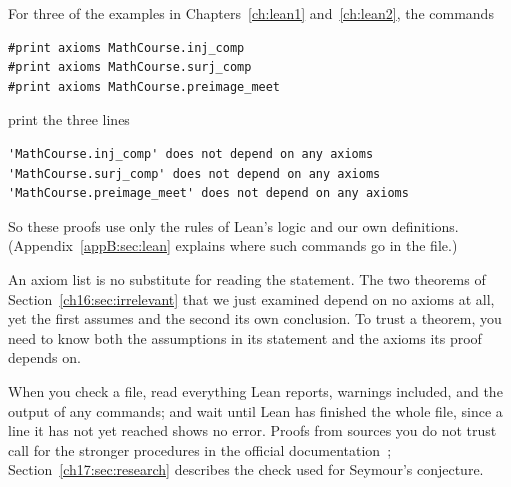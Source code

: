 For three of the examples in Chapters~\ref{ch:lean1} and~\ref{ch:lean2}, the commands
\par\noindent\begin{minipage}{\linewidth}
\begin{lstlisting}
#print axioms MathCourse.inj_comp
#print axioms MathCourse.surj_comp
#print axioms MathCourse.preimage_meet
\end{lstlisting}
\end{minipage}\par
print the three lines
\par\noindent\begin{minipage}{\linewidth}
\begin{lstlisting}
'MathCourse.inj_comp' does not depend on any axioms
'MathCourse.surj_comp' does not depend on any axioms
'MathCourse.preimage_meet' does not depend on any axioms
\end{lstlisting}
\end{minipage}\par
So these proofs use only the rules of Lean's logic and our own definitions. (Appendix~\ref{appB:sec:lean} explains where such commands go in the file.)

An axiom list is no substitute for reading the statement. The two theorems of Section~\ref{ch16:sec:irrelevant} that we just examined depend on no axioms at all, yet the first assumes  and the second its own conclusion. To trust a theorem, you need to know both the assumptions in its statement and the axioms its proof depends on.

When you check a file, read everything Lean reports, warnings included, and the output of any  commands; and wait until Lean has finished the whole file, since a line it has not yet reached shows no error. Proofs from sources you do not trust call for the stronger procedures in the official documentation~\cite{leanvalidate}; Section~\ref{ch17:sec:research} describes the check used for Seymour's conjecture.

